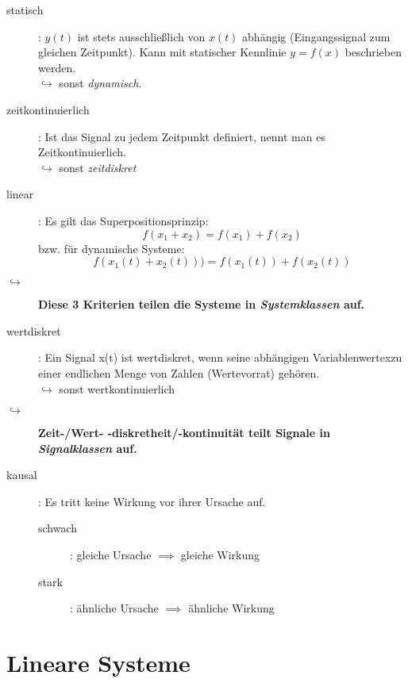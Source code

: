 \documentclass[a4paper, 11pt]{scrartcl}
\theoremstyle{definition}
\begin{document}
\begin{description}
    \item[statisch]: $y(t)$ ist stets ausschließlich von $x(t)$ abhängig (Eingangssignal zum gleichen Zeitpunkt). Kann mit statischer Kennlinie $y=f(x)$ beschrieben werden.\\
        $\hookrightarrow$ sonst \emph{dynamisch}.
    \item[zeitkontinuierlich]: Ist das Signal zu jedem Zeitpunkt definiert, nennt man es Zeitkontinuierlich. \\
    	$\hookrightarrow$ sonst \emph{zeitdiskret} 
    \item[linear]: Es gilt das Superpositionsprinzip: 
        \[f(x_1+x_2)=f(x_1)+f(x_2)\]
    bzw. für dynamische Systeme:
        \[f(x_1(t) + x_2(t)))=f(x_1(t)) + f(x_2(t))\]
    \item[$\hookrightarrow$]\textbf{Diese 3 Kriterien teilen die Systeme in \emph{Systemklassen} auf.}
    
    \item[wertdiskret]: Ein Signal x(t) ist wertdiskret, wenn seine abhängigen Variablenwertexzu  einer  endlichen  Menge  von  Zahlen  (Wertevorrat)  gehören.\\
    	$\hookrightarrow$ sonst wertkontinuierlich
    \item[$\hookrightarrow$]\textbf{Zeit-/Wert- -diskretheit/-kontinuität teilt Signale in \emph{Signalklassen} auf.}
    \item[kausal]: Es tritt keine Wirkung vor ihrer Ursache auf.
    \begin{description}
    	\item[schwach]: gleiche Ursache $\implies$ gleiche Wirkung
    	\item[stark]: ähnliche Ursache $\implies$ ähnliche Wirkung
    \end{description}
    
\end{description}

\section{Lineare Systeme}
\end{document}
